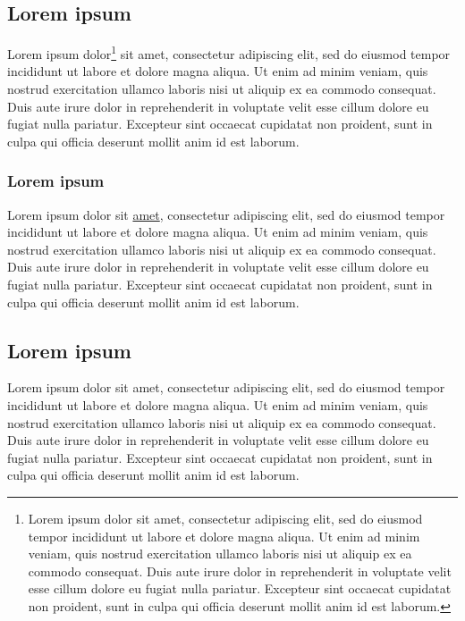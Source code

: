\documentclass[12pt,french,letterpaper]{article}
\begin{document}
\normalsize{\hypertarget{lorem-ipsum}{%
\subsection{Lorem ipsum}\label{lorem-ipsum}}

Lorem ipsum dolor\footnote{Lorem ipsum dolor sit amet, consectetur
  adipiscing elit, sed do eiusmod tempor incididunt ut labore et dolore
  magna aliqua. Ut enim ad minim veniam, quis nostrud exercitation
  ullamco laboris nisi ut aliquip ex ea commodo consequat. Duis aute
  irure dolor in reprehenderit in voluptate velit esse cillum dolore eu
  fugiat nulla pariatur. Excepteur sint occaecat cupidatat non proident,
  sunt in culpa qui officia deserunt mollit anim id est laborum.} sit
amet, consectetur adipiscing elit, sed do eiusmod tempor incididunt ut
labore et dolore magna aliqua. Ut enim ad minim veniam, quis nostrud
exercitation ullamco laboris nisi ut aliquip ex ea commodo consequat.
Duis aute irure dolor in reprehenderit in voluptate velit esse cillum
dolore eu fugiat nulla pariatur. Excepteur sint occaecat cupidatat non
proident, sunt in culpa qui officia deserunt mollit anim id est laborum.

\hypertarget{lorem-ipsum-1}{%
\subsubsection{Lorem ipsum}\label{lorem-ipsum-1}}

Lorem ipsum dolor sit \href{https://en.wiktionary.org/wiki/amour}{amet},
consectetur adipiscing elit, sed do eiusmod tempor incididunt ut labore
et dolore magna aliqua. Ut enim ad minim veniam, quis nostrud
exercitation ullamco laboris nisi ut aliquip ex ea commodo consequat.
Duis aute irure dolor in reprehenderit in voluptate velit esse cillum
dolore eu fugiat nulla pariatur. Excepteur sint occaecat cupidatat non
proident, sunt in culpa qui officia deserunt mollit anim id est laborum.

\hypertarget{lorem-ipsum-2}{%
\subsection{Lorem ipsum}\label{lorem-ipsum-2}}

Lorem ipsum dolor sit amet, consectetur adipiscing elit, sed do eiusmod
tempor incididunt ut labore et dolore magna aliqua. Ut enim ad minim
veniam, quis nostrud exercitation ullamco laboris nisi ut aliquip ex ea
commodo consequat. Duis aute irure dolor in reprehenderit in voluptate
velit esse cillum dolore eu fugiat nulla pariatur. Excepteur sint
occaecat cupidatat non proident, sunt in culpa qui officia deserunt
mollit anim id est laborum.

}
\end{document}
